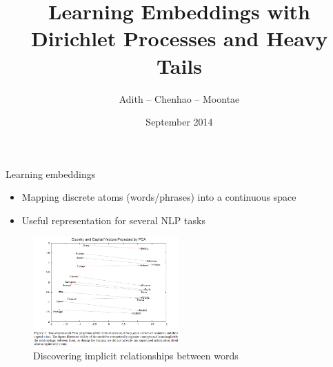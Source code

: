 \documentclass{beamer}
\title[ProbEmbed]{Learning Embeddings with Dirichlet Processes and Heavy Tails}
\author{Adith -- Chenhao -- Moontae}
\institute{Cornell}
\date{September 2014}
\begin{document}
\begin{frame}
\titlepage
\end{frame}

\begin{frame}{Learning embeddings}
  \begin{itemize}
    \item Mapping discrete atoms (words/phrases) into a continuous space
    \item Useful representation for several NLP tasks \cite{Turian}
  \end{itemize}
\begin{figure}[h!]
  \caption{Discovering implicit relationships between words \cite{CBOW}}
  \centering
    \includegraphics[width=0.5\textwidth]{CBOW.png}
\end{figure}
\end{frame}
\end{document}
